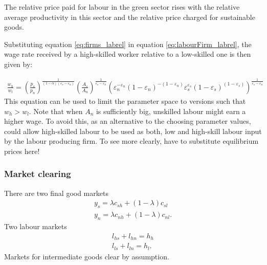 The relative price paid for labour in the green sector rises with the relative average productivity in this sector and the relative price charged for sustainable goods. 

Substituting equation  \ref{eq:firms_labrel}  in equation \ref{eq:labourFirm_labrel},
the wage rate received by a high-skilled worker relative to a low-skilled one is then given by:

\begin{align}
\frac{w_h}{w_l}=\left(\frac{p_s}{p_n}\right)^\frac{1}{(1-\alpha)(\varepsilon_s-\varepsilon_n)} \left(\frac{A_s}{A_n}\right)^\frac{1}{\varepsilon_s-\varepsilon_n}\left(\varepsilon_n^{-\varepsilon_n} (1-\varepsilon_n)^{-(1-\varepsilon_n)}\varepsilon_s^{\varepsilon_s} (1-\varepsilon_s)^{(1-\varepsilon_s)} \right)^\frac{1}{\varepsilon_s-\varepsilon_n}
\end{align}
This equation can be used to limit the parameter space to versions such that $w_h>w_l$. Note that when $A_n$ is sufficiently big, unskilled labour might earn a higher wage. To avoid this, as an alternative to the choosing parameter values, could allow high-skilled labour to be used as both, low and high-skill labour input by the labour producing firm. To see more clearly, have to substitute equilibrium prices here!

\subsubsection{Market clearing}
There are two final good markets
\begin{align*}
y_s=\lambda c_{sh}+(1-\lambda) c_{sl}\\
y_n=\lambda c_{nh}+(1-\lambda) c_{nl}.
\end{align*}
Two labour markets
\begin{align*}
l_{hs}+l_{hn}=h_h\\
l_{ls}+l_{ln}=h_l.
\end{align*}
Markets for intermediate goods clear by assumption.


